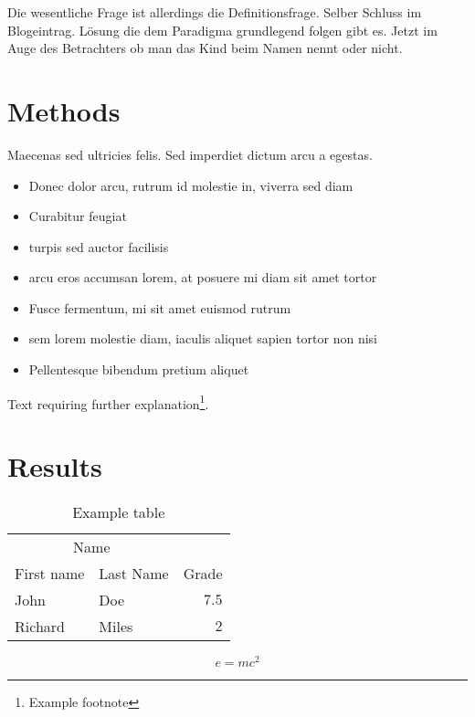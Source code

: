 \documentclass[twoside,twocolumn]{article}
\begin{document}
Die wesentliche Frage ist allerdings die Definitionsfrage. Selber Schluss im Blogeintrag. Lösung die dem Paradigma grundlegend folgen gibt es. Jetzt im Auge des Betrachters ob man das Kind beim Namen nennt oder nicht.





\section{Methods}

Maecenas sed ultricies felis. Sed imperdiet dictum arcu a egestas. 
\begin{itemize}
\item Donec dolor arcu, rutrum id molestie in, viverra sed diam
\item Curabitur feugiat
\item turpis sed auctor facilisis
\item arcu eros accumsan lorem, at posuere mi diam sit amet tortor
\item Fusce fermentum, mi sit amet euismod rutrum
\item sem lorem molestie diam, iaculis aliquet sapien tortor non nisi
\item Pellentesque bibendum pretium aliquet
\end{itemize}
\blindtext %

Text requiring further explanation\footnote{Example footnote}.


\section{Results}

\begin{table}
\caption{Example table}
\centering
\begin{tabular}{llr}
\toprule
\multicolumn{2}{c}{Name} \\
\cmidrule(r){1-2}
First name & Last Name & Grade \\
\midrule
John & Doe & $7.5$ \\
Richard & Miles & $2$ \\
\bottomrule
\end{tabular}
\end{table}

\blindtext %

\begin{equation}
\label{eq:emc}
e = mc^2
\end{equation}
\end{document}
